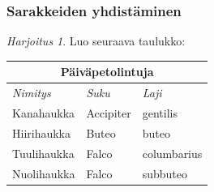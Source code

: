 \documentclass[handout]{beamer}
\theoremstyle{remark}
\newtheorem{harj}{Harjoitus}[section]
\begin{document}
\begin{frame}[fragile]
\frametitle{Sarakkeiden yhdistäminen}

\begin{harj}
Luo seuraava taulukko:
\begin{table}
\begin{tabular}{|l|l|l|}
\hline
\multicolumn{3}{|c|}{\Large Päiväpetolintuja}\\
\hline
\textit{Nimitys} & \textit{Suku} & \textit{Laji}\\ \hline
Kanahaukka & Accipiter &  gentilis\\ \hline
Hiirihaukka & Buteo & buteo\\ \hline
Tuulihaukka & Falco & columbarius\\\hline
Nuolihaukka & Falco & subbuteo\\ \hline
\end{tabular}
\end{table}
\end{harj}

\end{frame}
\end{document}
